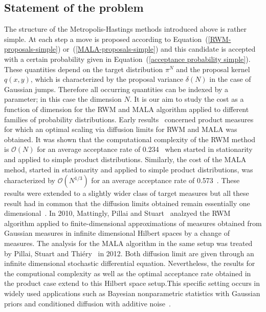 \subsection*{Statement of the problem}

The structure of the Metropolis-Hastings methods introduced above is rather simple. At each step a move is proposed according to Equation~(\ref{RWM-proposals-simple}) or~(\ref{MALA-proposals-simple}) and this candidate is accepted with a certain probability given in Equation~(\ref{acceptance probability simple}). These quantities depend on the target distribution $ \pi^{N} $ and the proposal kernel $ q(x,y) $, which is characterized by the proposal variance $ \delta(N) $ in the case of Gaussian jumps. Therefore all occurring quantities can be indexed by a parameter; in this case the dimension $N$. It is our aim to study the cost as a function of dimension for the RWM and MALA algorithm applied to different families of probability distributions. Early results~\autocite{Roberts1997, Roberts1998} concerned product measures for which an optimal scaling via diffusion limits for RWM and MALA was obtained. It was shown that the computational complexity of the RWM method  is $\mathcal{O}(N)$ for an average acceptance rate of 0.234~\autocite{Roberts1997} when started in stationarity and applied to simple product distributions. Similarly, the cost of the MALA mehod, started in stationarity and applied to simple product distributions, was characterized by $\mathcal{O}(N^{1/3})$ for an average acceptance rate of 0.573~\autocite{Roberts1998}. These results were  extended to a slightly wider class of target measures but all these result had in common that the diffusion limits obtained remain essentially one dimensional~\autocite{Bedard2007, breyer2004, Christensen2003}. In 2010,  Mattingly, Pillai and Stuart~\autocite{Mattingly2010} analzyed the RWM algorithm applied to finite-dimensional approximations of measures obtained from Gaussian measures in infinite dimensional Hilbert spaces by a change of measures.  The analysis for the MALA algorithm in the same setup was treated by Pillai, Stuart and Thi\'{e}ry~\autocite{Pillai2012} in 2012. Both diffusion limit are given through an infinite dimensional stochastic differential equation. Nevertheless, the results for the computional complexity as well as the optimal acceptance rate obtained in the product case extend to this Hilbert space setup.This specific setting occurs in widely used applications such as Bayesian nonparametric statistics with Gaussian priors and conditioned diffusion with additive noise~\autocite{Beskos2009, Stuart2010}. 

